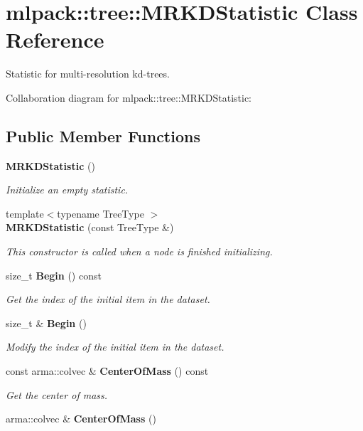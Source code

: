 \section{mlpack\-:\-:tree\-:\-:M\-R\-K\-D\-Statistic Class Reference}
\label{classmlpack_1_1tree_1_1MRKDStatistic}


Statistic for multi-\/resolution kd-\/trees.  




Collaboration diagram for mlpack\-:\-:tree\-:\-:M\-R\-K\-D\-Statistic\-:
\subsection*{Public Member Functions}
\begin{DoxyCompactItemize}
\item 
{\bf M\-R\-K\-D\-Statistic} ()
\begin{DoxyCompactList}\small\item\em Initialize an empty statistic. \end{DoxyCompactList}\item 
{\footnotesize template$<$typename Tree\-Type $>$ }\\{\bf M\-R\-K\-D\-Statistic} (const Tree\-Type \&)
\begin{DoxyCompactList}\small\item\em This constructor is called when a node is finished initializing. \end{DoxyCompactList}\item 
size\-\_\-t {\bf Begin} () const 
\begin{DoxyCompactList}\small\item\em Get the index of the initial item in the dataset. \end{DoxyCompactList}\item 
size\-\_\-t \& {\bf Begin} ()
\begin{DoxyCompactList}\small\item\em Modify the index of the initial item in the dataset. \end{DoxyCompactList}\item 
const arma\-::colvec \& {\bf Center\-Of\-Mass} () const 
\begin{DoxyCompactList}\small\item\em Get the center of mass. \end{DoxyCompactList}\item 
arma\-::colvec \& {\bf Center\-Of\-Mass} ()

\end{DoxyCompactItemize}

